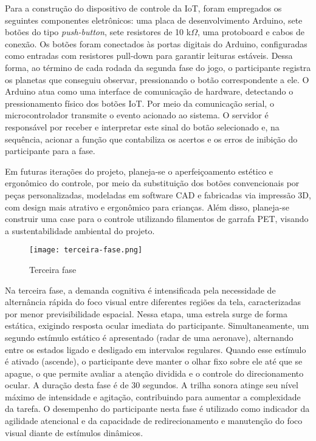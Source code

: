 Para a construção do dispositivo de controle da IoT, foram empregados os seguintes componentes eletrônicos: uma placa de desenvolvimento Arduino, sete botões do tipo \textit{push-button}, sete resistores de 10 k$\Omega$, uma protoboard e cabos de conexão. Os botões foram conectados às portas digitais do Arduino, configuradas como entradas com resistores pull-down para garantir leituras estáveis. Dessa forma, ao término de cada rodada da segunda fase do jogo, o participante registra os planetas que conseguiu observar, pressionando o botão correspondente a ele. O Arduino atua como uma interface de comunicação de hardware, detectando o pressionamento físico dos botões IoT. Por meio da comunicação serial, o microcontrolador transmite o evento acionado ao sistema. O servidor é responsável por receber e interpretar este sinal do botão selecionado e, na sequência, acionar a função que contabiliza os acertos e os erros de inibição do participante para a fase.

Em futuras iterações do projeto, planeja-se o aperfeiçoamento estético e ergonômico do controle, por meio da substituição dos botões convencionais por peças personalizadas, modeladas em software CAD e fabricadas via impressão 3D, com design mais atrativo e ergonômico para crianças. Além disso, planeja-se construir uma case para o controle utilizando filamentos de garrafa PET, visando a sustentabilidade ambiental do projeto.

\begin{figure}[H]
    \centering
    \caption{Terceira fase}%
    \label{fig:terceira-fase}
    \texttt{[image: terceira-fase.png]}%
\end{figure}

Na terceira fase, a demanda cognitiva é intensificada pela necessidade de alternância rápida do foco visual entre diferentes regiões da tela, caracterizadas por menor previsibilidade espacial. Nessa etapa, uma estrela surge de forma estática, exigindo resposta ocular imediata do participante. Simultaneamente, um segundo estímulo estático é apresentado (radar de uma aeronave), alternando entre os estados ligado e desligado em intervalos regulares. Quando esse estímulo é ativado (ascende), o participante deve manter o olhar fixo sobre ele até que se apague, o que permite avaliar a atenção dividida e o controle do direcionamento ocular. A duração desta fase é de 30 segundos. A trilha sonora atinge seu nível máximo de intensidade e agitação, contribuindo para aumentar a complexidade da tarefa. O desempenho do participante nesta fase é utilizado como indicador da agilidade atencional e da capacidade de redirecionamento e manutenção do foco visual diante de estímulos dinâmicos.


